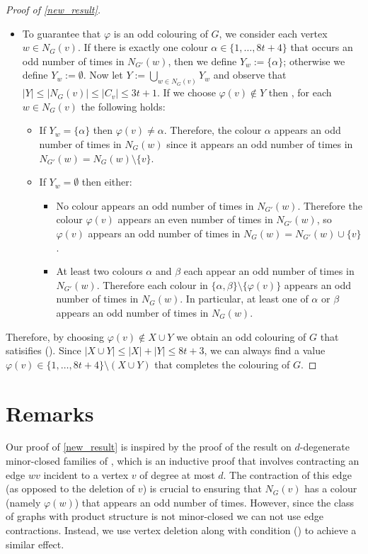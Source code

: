 \documentclass{patmorin}
\begin{document}
\begin{proof}[Proof of \cref{new_result}]
\begin{itemize}
    \item To guarantee that $\varphi$ is an odd colouring of $G$, we consider each vertex $w\in N_{G}(v)$.  If there is exactly one colour $\alpha\in\{1,\ldots,8t+4\}$ that occurs an odd number of times in $N_{G'}(w)$, then we define $Y_{w} := \{\alpha\}$; otherwise we define $Y_{w}:=\emptyset$. Now let $Y:=\bigcup_{w\in N_{G}(v)} Y_{w}$ and observe that $|Y|\le |N_G(v)|\le |C_v|\le 3t+1$.
    If we choose $\varphi(v)\not\in Y$ then , for each $w\in N_{G}(v)$ the following holds:
    \begin{itemize}
      \item If $Y_{w}=\{\alpha\}$ then $\varphi(v)\neq\alpha$. Therefore, the colour $\alpha$ appears an odd number of times in $N_{G}(w)$ since it appears an odd number of times in $N_{G'}(w)=N_G(w)\setminus\{v\}$.
      \item If $Y_{w}=\emptyset$ then either:
      \begin{itemize}
        \item No colour appears an odd number of times in $N_{G'}(w)$.  Therefore the colour $\varphi(v)$ appears an even number of times in $N_{G'}(w)$, so $\varphi(v)$ appears an odd number of times in $N_G(w)=N_{G'}(w)\cup\{v\}$.
        \item At least two colours $\alpha$ and $\beta$ each appear an odd number of times in $N_{G'}(w)$.  Therefore each colour in $\{\alpha,\beta\}\setminus\{\varphi(v)\}$ appears an odd number of times in $N_{G}(w)$.  In particular, at least one of $\alpha$ or $\beta$ appears an odd number of times in $N_G(w)$.
      \end{itemize}
    \end{itemize}
  \end{itemize}
  Therefore, by choosing $\varphi(v)\not\in X\cup Y$ we obtain an odd colouring of $G$ that satisifies ().  Since $|X\cup Y|\le |X|+|Y|\le 8t+3$, we can always find a value $\varphi(v)\in \{1,\ldots,8t+4\}\setminus(X\cup Y)$ that completes the colouring of $G$.
\end{proof}


\section{Remarks}

Our proof of \cref{new_result} is inspired by the proof of the result on $d$-degenerate minor-closed families of \citet{cranston.lafferty.ea:note}, which is an inductive proof that involves contracting an edge $wv$ incident to a vertex $v$ of degree at most $d$.  The contraction of this edge (as opposed to the deletion of $v$) is crucial to ensuring that $N_G(v)$ has a colour (namely $\varphi(w)$) that appears an odd number of times.  However, since the class of graphs with product structure is not minor-closed we can not use edge contractions. Instead, we use vertex deletion along with condition () to achieve a similar effect.
\end{document}
